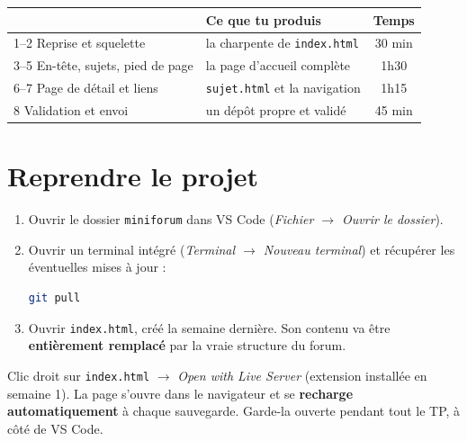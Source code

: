 \documentclass[a4paper,11pt]{article}
\newcommand{\hdr}[1]{\multicolumn{1}{l}{\color{white}\bfseries #1}}
\newcommand{\hdrc}[1]{\multicolumn{1}{c}{\color{white}\bfseries #1}}
\renewcommand{\arraystretch}{1.3}
\begin{document}
\vspace{4pt}
\begin{center}
\renewcommand{\arraystretch}{1.0}
\begin{tabularx}{\linewidth}{p{6.4cm}Xc}
  \toprule
  \rowcolor{uniNavy}
  \hdr{Étape} & \hdr{Ce que tu produis} & \hdrc{Temps} \\
  \midrule
  \rowcolor{uniPaper}
  1--2 \quad Reprise et squelette & la charpente de \texttt{index.html} & 30 min \\
  3--5 \quad En-tête, sujets, pied de page & la page d'accueil complète & 1h30 \\
  \rowcolor{uniPaper}
  6--7 \quad Page de détail et liens & \texttt{sujet.html} et la navigation & 1h15 \\
  8 \quad\; Validation et envoi & un dépôt propre et validé & 45 min \\
  \bottomrule
\end{tabularx}
\end{center}

\section{Reprendre le projet}

\begin{enumerate}
  \item Ouvrir le dossier \texttt{miniforum} dans VS Code (\textit{Fichier $\rightarrow$ Ouvrir le dossier}).
  \item Ouvrir un terminal intégré (\textit{Terminal $\rightarrow$ Nouveau terminal}) et récupérer les éventuelles mises à jour :
\begin{lstlisting}[language=bash, numbers=none]
git pull
\end{lstlisting}
  \item Ouvrir \texttt{index.html}, créé la semaine dernière. Son contenu va être \textbf{entièrement remplacé} par la vraie structure du forum.
\end{enumerate}

\begin{tcolorbox}[astuce, title={Le réflexe Live Server}]
Clic droit sur \texttt{index.html} $\rightarrow$ \textit{Open with Live Server} (extension installée en semaine 1). La page s'ouvre dans le navigateur et se \textbf{recharge automatiquement} à chaque sauvegarde. Garde-la ouverte pendant tout le TP, à côté de VS Code.
\end{tcolorbox}
\end{document}
